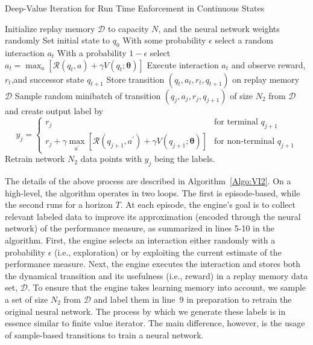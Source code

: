 \begin{algorithm}[h!]
\caption{Deep-Value Iteration for Run Time Enforcement in Continuous States}
\label{Algo:VI2}
\begin{algorithmic}[1]
\STATE Initialize replay memory $\mathcal{D}$ to capacity $N$, and the neural network weights randomly 
\STATE Set initial state to $q_{0}$
\STATE With some probability $\epsilon$ select a random interaction $a_{t}$
\STATE With a probability $1 - \epsilon$ select $a_{t} = \max_{a} \left[\mathcal{R}(q_{t}, a) + \gamma V(q_{t};\bm{\theta})\right]$
\STATE Execute interaction $a_{t}$ and observe reward, $r_{t}$,and successor state $q_{t+1}$
\STATE Store transition $\left(q_{t}, a_{t}, r_{t}, q_{t+1}\right)$ on replay memory $\mathcal{D}$
\STATE Sample random minibatch of transition $\left(q_{j}, a_{j}, r_{j}, q_{j+1}\right)$ of size $N_{2}$ from $\mathcal{D}$ and create output label by 
\begin{displaymath}
   y_{j} = \left\{
     \begin{array}{lr}
       r_{j} & \text{for terminal $q_{j+1}$}\\
        r_{j} + \gamma \max_{a^{\prime}}\left[\mathcal{R}(q_{j+1}, a^{\prime}) + \gamma V(q_{j+1};\bm{\theta})\right]  & \text{for non-terminal $q_{j+1}$}
     \end{array}
   \right.
\end{displaymath} 
\ENDFOR
\STATE Retrain network $N_{2}$ data points with $y_{j}$ being the labels. 
\ENDFOR
\end{algorithmic}
\end{algorithm}
The details of the above process are described in Algorithm~\ref{Algo:VI2}. On a high-level, the algorithm operates in two loops. The first is episode-based, while the second runs for a horizon $T$. At each episode, the engine's goal is to collect relevant labeled data to improve its approximation (encoded through the neural network) of the performance measure, as summarized in lines 5-10 in the algorithm. First, the engine selects an interaction either randomly with a probability $\epsilon$ (i.e., exploration) or by exploiting the current estimate of the performance measure. Next, the engine executes the interaction and stores both the dynamical transition and its usefulness (i.e., reward) in a replay memory data set, $\mathcal{D}$. To ensure that the engine takes learning memory into account, we sample a set of size $N_{2}$ from $\mathcal{D}$ and label them in line~9  in preparation to retrain the original neural network. The process by which we generate these labels is in essence similar to finite value iterator. The main difference, however, is the usage of sample-based transitions to train a neural network.  






